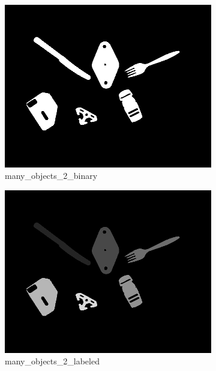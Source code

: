 \documentclass[bwprint]{gmcmthesis}
\numberwithin{figure}{section}
\begin{document}
\begin{enumerate}[label=\alph*.]
\begin{figure}[h]
\begin{subfigure}[b]{0.3\textwidth}
            \includegraphics[width=\textwidth]{../output/many_objects_2_binary.png}
            \caption{many\_objects\_2\_binary}
            \label{fig:subfigure6}
        \end{subfigure}
        \hfill
        \begin{subfigure}[b]{0.3\textwidth}
            \centering
            \includegraphics[width=\textwidth]{../output/many_objects_2_labeled.png}
            \caption{many\_objects\_2\_labeled}
            \label{fig:subfigure7}
        \end{subfigure}
        \newline
        \begin{subfigure}[b]{\textwidth}

\end{subfigure}
\end{figure}
\end{enumerate}
\end{document}
